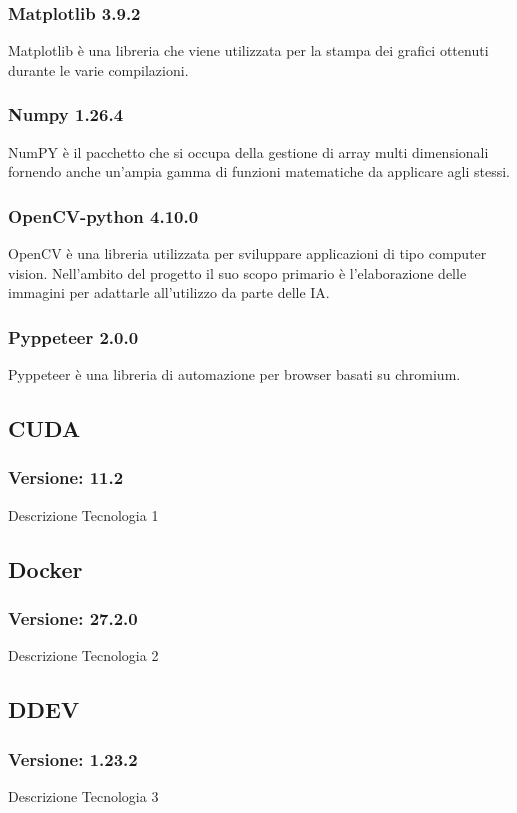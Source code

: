 \subsubsection{Matplotlib 3.9.2}
Matplotlib è una libreria che viene utilizzata per la stampa dei grafici ottenuti durante le varie compilazioni. 

\subsubsection{Numpy 1.26.4}
NumPY è il pacchetto che si occupa della gestione di array multi dimensionali fornendo anche un'ampia gamma di funzioni matematiche da applicare agli stessi.

\subsubsection{OpenCV-python 4.10.0}
OpenCV è una libreria utilizzata per sviluppare applicazioni di tipo computer vision. Nell'ambito del progetto il suo scopo primario è l'elaborazione delle immagini per adattarle all'utilizzo da parte delle IA. 

\subsubsection{Pyppeteer 2.0.0}
Pyppeteer è una libreria di automazione per browser basati su chromium.

\subsection{CUDA}
\subsubsection{Versione: 11.2}
Descrizione Tecnologia 1

\subsection{Docker}
\subsubsection{Versione: 27.2.0}
Descrizione Tecnologia 2

\subsection{DDEV}
\subsubsection{Versione: 1.23.2}
Descrizione Tecnologia 3

